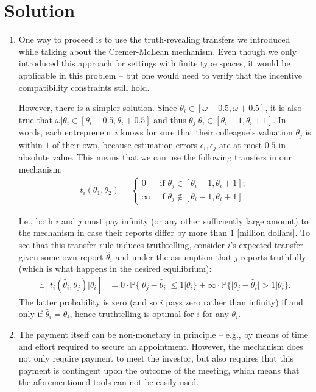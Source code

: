 \documentclass[a4paper]{article}
\begin{document}
\section*{Solution}
	\begin{enumerate}
		\item One way to proceed is to use the truth-revealing transfers we introduced while talking about the Cremer-McLean mechanism. Even though we only introduced this approach for settings with finite type spaces, it would be applicable in this problem -- but one would need to verify that the incentive compatibility constraints still hold.
		
		However, there is a simpler solution. Since $\theta_i \in [ \omega-0.5, \omega+0.5]$, it is also true that $\omega|\theta_i \in [\theta_i-0.5, \theta_i+0.5]$ and thus $\theta_j|\theta_i \in [\theta_i-1, \theta_i+1]$. In words, each entrepreneur $i$ knows for sure that their colleague's valuation $\theta_j$ is within $1$ of their own, because estimation errors $\epsilon_i,\epsilon_j$ are at most $0.5$ in absolute value. This means that we can use the following transfers in our mechanism:
		\begin{align*}
			t_i(\theta_1,\theta_2) = 
			\begin{cases}
				0 & \text{ if } \theta_j \in [\theta_i-1,\theta_i+1];
				\\
				\infty & \text{ if } \theta_j \notin [\theta_i-1,\theta_i+1].
			\end{cases}
		\end{align*}
		
		I.e., both $i$ and $j$ must pay infinity (or any other sufficiently large amount) to the mechanism in case their reports differ by more than $1$ [million dollars]. To see that this transfer rule induces truthtelling, consider $i$'s expected transfer given some own report $\hat{\theta}_i$ and under the assumption that $j$ reports truthfully (which is what happens in the desired equilibrium):
		\begin{align*}
			\mathbb{E} [t_i(\hat{\theta}_i,\theta_j) | \theta_i] &= 0 \cdot \mathbb{P} \{ |\theta_j-\hat{\theta}_i| \leq 1 | \theta_i \} + \infty \cdot \mathbb{P} \{ |\theta_j-\hat{\theta}_i| > 1 | \theta_i \}.
		\end{align*}
		The latter probability is zero (and so $i$ pays zero rather than infinity) if and only if $\hat{\theta}_i = \theta_i$, hence truthtelling is optimal for $i$ for any $\theta_i$.
		
		\item The payment itself can be non-monetary in principle -- e.g., by means of time and effort required to secure an appointment. However, the mechanism does not only require payment to meet the investor, but also requires that this payment is contingent upon the outcome of the meeting, which means that the aforementioned tools can not be easily used. 
		

\end{enumerate}
\end{document}
